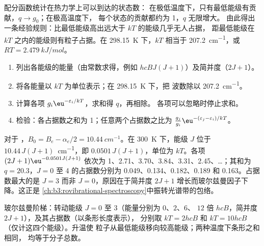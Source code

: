 配分函数统计在热力学上可以到达的状态数：
在极低温度下，只有最低能级有贡献，$q \to g_0$；在极高温度下，
每个状态的贡献都约为 1，$q$ 无限增大。
由此得出一条经验规则：比最低能级高出远大于 $kT$ 的能级几乎无人占据，
距最低能级在 $kT$ 之内的能级则有粒子占据。在 \qty{298.15}{K} 下，$kT$
相当于 \qty{207.2}{cm^{-1}}，或 $RT = \qty{2.479}{kJ/mol}$。

\begin{method}[由光谱常数求能级占据数]\label{met:b3:partition-functions:populations}
\begin{enumerate}
  \item 列出各能级的能量（由常数求得，例如
        $hcBJ(J+1)$）及简并度（$2J + 1$）。
  \item 将各能量以 $kT$ 为单位表示；在 \qty{298.15}{K} 下，把
        波数除以 \qty{207.2}{cm^{-1}}。
  \item 计算各项 $g_i\eu^{-\varepsilon_i/kT}$，求和得 $q$，再相除。
        各项可以忽略时停止求和。
  \item 检验：各占据数之和为 1；任意两个占据数之比为
        $\frac{g_j}{g_i}\eu^{-(\varepsilon_j-\varepsilon_i)/kT}$。
\end{enumerate}
\end{method}

\begin{example}[氯化氢的转动能级]\label{ex:b3:partition-functions:hcl}
对于 ，$B_0 = B_e - \alpha_e/2 = \qty{10.44}{cm^{-1}}$。在 \qty{300}{K} 下，能级 $J$
位于 $10.44\,J(J+1)$~\unit{cm^{-1}}，即 $0.0501\,J(J+1)$，单位为 $kT$。各项
$(2J+1)\eu^{-0.0501J(J+1)}$ 依次为 1、2.71、3.70、3.84、3.31、2.45、\dots；其和为
$q = 20.3$，$J = 0$ 至 4 的占据数分别为 0.049、0.134、0.182、0.189 和
0.163。占据数最大的是 $J = 3$ 而非 $J = 0$，原因在于简并度
$2J + 1$ 增长而玻尔兹曼因子下降。这正是
\cref{ch:b3:rovibrational-spectroscopy}中振转光谱带的包络。
\end{example}

\begin{omfigure}

{\small 玻尔兹曼阶梯：转动能级 $J = 0$ 至 3（能量分别为 $0$、$2$、$6$、
$12$ 倍 $hcB$，简并度 $2J + 1$），及其占据数（以条形长度表示），
分别取 $kT = 2hcB$ 和 $kT = 10hcB$（仅计这四个能级）。升温使
粒子从最低能级移向较高能级；两种温度下条形之和相同，
均等于分子总数。}
\end{omfigure}


